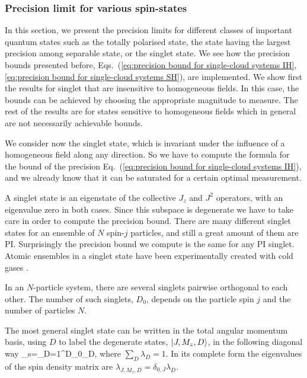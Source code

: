 \subsubsection{Precision limit for various spin-states}

In this section, we present the precision limits for different classes of
important quantum states such as the totally polarised state,
the state having the largest precision among separable state,
or the singlet state.
We see how the precision bounds presented before, Eqs.~(\ref{eq:precision
bound for single-cloud systems IH}, \ref{eq:precision bound for single-cloud
systems SH}), are implemented.
We show first the results for singlet that are insensitive to homogeneous
fields.
In this case, the bounds can be achieved by choosing
the appropriate magnitude to measure.
The rest of the results are for states sensitive to homogeneous
fields which in general are not necessarily achievable bounds.


We consider now the singlet state, which is invariant under the influence
of a homogeneous field along any direction.
So we have to compute the formula for the bound
of the precision Eq.~(\ref{eq:precision bound for single-cloud systems IH}),
and we already know that it can be saturated for a
certain optimal measurement.

A singlet state is an eigenstate of the collective $J_z$ and $J^2$
operators, with an eigenvalue zero in both cases.
Since this subspace is degenerate we have to take care in order to compute the
precision bound. There are many different singlet states for an ensemble of $N$
spin-$j$ particles, and still a great amount of them are PI.
Surprisingly the precision bound we compute is the same
for any PI singlet. Atomic ensembles in a singlet state have been experimentally
created with cold gases \cite{Toth2010,Behbood2014}.

In an $N$-particle system, there are several singlets pairwise orthogonal to each other. The number of such singlets, $D_0$, depends on the particle spin $j$ and the number of particles $N$.

The most general singlet state can be written in the total angular momentum basis, using $D$ to label the degenerate states, $\vert J,M_z,D \rangle$, in the following diagonal way
\be
\rho_{\rm s}=\sum_{D=1}^{D_0}\lambda_D,
\label{eq:definition of a general singlet}
\ee
where $\sum_D \lambda_D=1$.
In its complete form the eigenvalues of the spin density matrix are $\lambda_{J,M_z,D}=\delta_{0,J}\lambda_D$.

